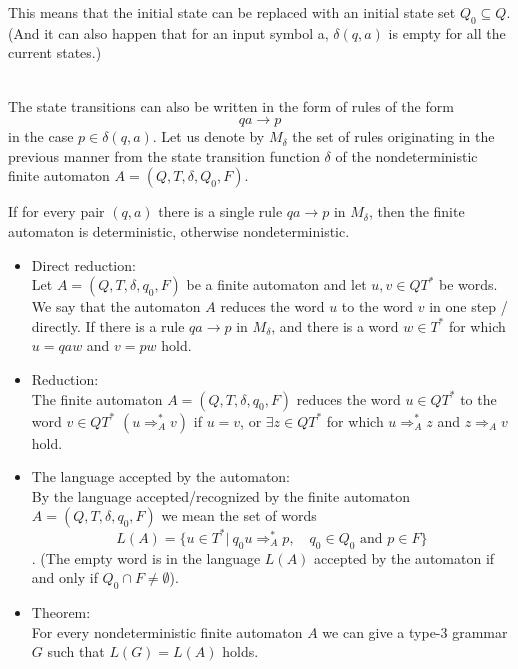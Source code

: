 \documentclass[margin=0px]{article}
\begin{document}
\begin{description}
        This means that the initial state can be replaced with an initial state set $Q_0 \subseteq Q$.
        (And it can also happen that for an input symbol a, $\delta(q, a)$ is empty for all the current states.)
    \item[Properties] \hfill \\
        The state transitions can also be written in the form of rules of the form
        \[qa \rightarrow p\]
        in the case $p \in \delta(q, a) $. Let us denote by $M_\delta$ the set of rules originating in the previous manner from the state transition function $\delta$ of the nondeterministic finite automaton $A = (Q, T, \delta,Q_0, F)$.

        If for every pair $(q, a)$ there is a single rule $qa \rightarrow p$ in $M_\delta$, then the finite automaton is deterministic, otherwise nondeterministic.

        \begin{itemize}
            \item Direct reduction: \\
                  Let $A = (Q, T, \delta, q_0, F)$ be a finite automaton and let $u, v \in QT^*$ be words. We say that the automaton $A$ reduces the word $u$ to the word $v$ in one step / directly. If there is a rule $qa \rightarrow p$ in $M_\delta$, and there is a word $w \in T^*$ for which $u = qaw$ and $v = pw$ hold.

            \item Reduction:\\
                  The finite automaton $A = (Q, T, \delta, q_0, F)$ reduces the word $u \in QT^*$ to the word $v \in QT^*$ $(u \Longrightarrow_A^* v)$ if $u = v$, or $ \exists z \in QT^*$ for which $u \Longrightarrow_A^* z$ and $z \Longrightarrow_A v$ hold.

            \item The language accepted by the automaton:\\
                  By the language accepted/recognized by the finite automaton $A = (Q, T, \delta, q_0, F)$ we mean the set of words \[ L(A) = \{u \in T^* | \ q_0u \Longrightarrow_A^* p, \quad q_0 \in Q_0  \textrm{ and }  p \in F\} \].  (The empty word is in the language $L(A)$ accepted by the automaton if and only if $Q_0 \cap F \neq \emptyset$).

            \item Theorem:\\
                  For every nondeterministic finite automaton $A$ we can give a type-3 grammar $G$ such that $L(G) = L(A)$ holds.


\end{itemize}
\end{description}
\end{document}
